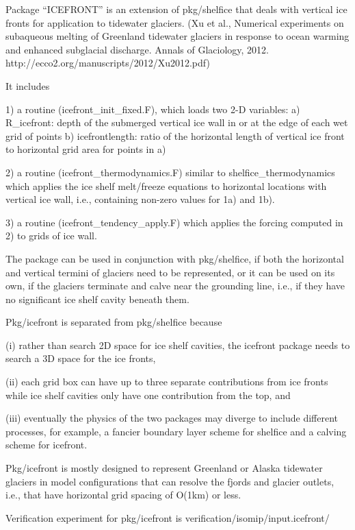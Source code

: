 
Package ``ICEFRONT'' is an extension of pkg/shelfice that deals with vertical
ice fronts for application to tidewater glaciers.
(Xu et al., Numerical experiments on subaqueous melting of Greenland tidewater 
 glaciers in response to ocean warming and enhanced subglacial discharge. 
 Annals of Glaciology, 2012. http://ecco2.org/manuscripts/2012/Xu2012.pdf)

It includes

1) a routine (icefront_init_fixed.F), which loads two 2-D variables:
  a) R_icefront: depth of the submerged vertical ice wall in or at the edge of 
     each wet grid of points
  b) icefrontlength: ratio of the horizontal length of vertical ice front to 
     horizontal grid area for points in a)

2) a routine (icefront_thermodynamics.F) similar to shelfice_thermodynamics 
   which applies the ice shelf melt/freeze equations to horizontal locations 
   with vertical ice wall, i.e., containing non-zero values for 1a) and 1b). 

3) a routine (icefront_tendency_apply.F) which applies the forcing computed
   in 2) to grids of ice wall.

The package can be used in conjunction with pkg/shelfice, if both the
horizontal and vertical termini of glaciers need to be represented, or it can
be used on its own, if the glaciers terminate and calve near the grounding
line, i.e., if they have no significant ice shelf cavity beneath them.

Pkg/icefront is separated from pkg/shelfice because

(i) rather than search 2D space for ice shelf cavities, the icefront package
needs to search a 3D space for the ice fronts,

(ii) each grid box can have up to three separate contributions from ice
fronts while ice shelf cavities only have one contribution from the top, and

(iii) eventually the physics of the two packages may diverge to include
different processes, for example, a fancier boundary layer scheme for shelfice
and a calving scheme for icefront.

Pkg/icefront is mostly designed to represent Greenland or Alaska tidewater 
glaciers in model configurations that can resolve the fjords and glacier outlets,
i.e., that have horizontal grid spacing of O(1km) or less.

Verification experiment for pkg/icefront is verification/isomip/input.icefront/

